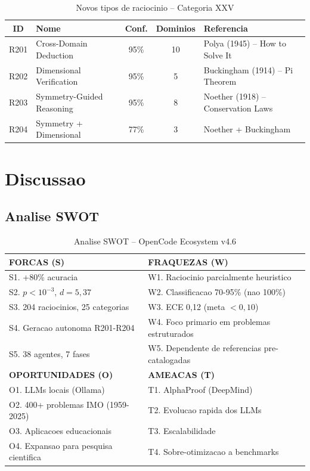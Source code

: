 \documentclass[5p]{elsarticle}
\begin{document}
\begin{table}[H]
 \centering
 \caption{Novos tipos de raciocinio -- Categoria XXV}
 \label{tab:r201}
 \footnotesize
 \begin{tabular}{clccp{4cm}}
 \toprule
 \textbf{ID} & \textbf{Nome} & \textbf{Conf.} & \textbf{Dominios} & \textbf{Referencia}\\
 \midrule
 R201 & Cross-Domain Deduction & 95\% & 10 & Polya (1945) -- How to Solve It\\
 R202 & Dimensional Verification & 95\% & 5 & Buckingham (1914) -- Pi Theorem\\
 R203 & Symmetry-Guided Reasoning & 95\% & 8 & Noether (1918) -- Conservation Laws\\
 R204 & Symmetry + Dimensional & 77\% & 3 & Noether + Buckingham\\
 \bottomrule
 \end{tabular}
\end{table}

\section{Discussao}

\subsection{Analise SWOT}

\begin{table}[H]
 \centering
 \caption{Analise SWOT -- OpenCode Ecosystem v4.6}
 \label{tab:swot}
 \footnotesize
 \begin{tabular}{p{7cm}p{7cm}}
 \toprule
 \textbf{FORCAS (S)} & \textbf{FRAQUEZAS (W)}\\
 \midrule
 S1. +80\% acuracia & W1. Raciocinio parcialmente heuristico\\
 S2. $p<10^{-3}$, $d=5,37$ & W2. Classificacao 70-95\% (nao 100\%)\\
 S3. 204 raciocinios, 25 categorias & W3. ECE 0,12 (meta $<0,10$)\\
 S4. Geracao autonoma R201-R204 & W4. Foco primario em problemas estruturados\\
 S5. 38 agentes, 7 fases & W5. Dependente de referencias pre-catalogadas\\
 \midrule
 \textbf{OPORTUNIDADES (O)} & \textbf{AMEACAS (T)}\\
 \midrule
 O1. LLMs locais (Ollama) & T1. AlphaProof (DeepMind)\\
 O2. 400+ problemas IMO (1959-2025) & T2. Evolucao rapida dos LLMs\\
 O3. Aplicacoes educacionais & T3. Escalabilidade\\
 O4. Expansao para pesquisa cientifica & T4. Sobre-otimizacao a benchmarks\\
 \bottomrule
 \end{tabular}
\end{table}
\end{document}
